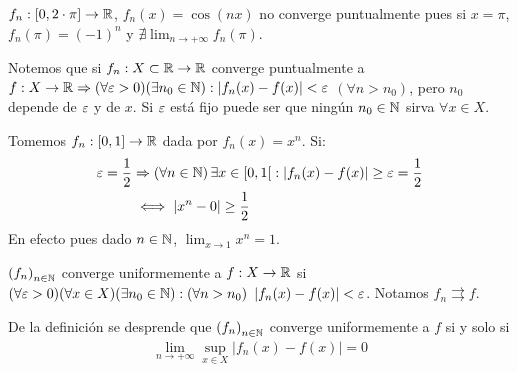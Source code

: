 \begin{eg}
  \(f_n: [0, 2 \cdot \pi] \to \mathbb{R} \), \(f_n(x) = \cos(nx)\) no converge puntualmente pues si \(x = \pi \), \(f_n(\pi) = {(-1)}^n\) y \(\nexists \lim_{n \to +\infty} f_n(\pi)\).
\end{eg}

Notemos que si \(f_n: X \subset \mathbb{R} \to \mathbb{R} \) converge puntualmente a \(f: X \to \mathbb{R} \Rightarrow (\forall \varepsilon > 0)(\exists n_0 \in \mathbb{N}) : |f_n(x) - f(x)| < \varepsilon \) \((\forall n > n_0)\), pero \(n_0\) depende de \(\varepsilon \) y de \(x\). Si \(\varepsilon \) está fijo puede ser que ningún \(n_0 \in \mathbb{N} \) sirva \(\forall x \in X\).

\begin{eg}
  Tomemos \(f_n: [0, 1] \to \mathbb{R} \) dada por \(f_n(x) = x^n\). Si: \begin{align*}
    \e = \frac{1}{2} & \Rightarrow (\forall n \in \N) \, \exists x \in \interval[open right]{0}{1} : |f_n(x) - f(x)| \geq \e = \frac{1}{2} \\
                     & \iff |x^n - 0| \geq \frac{1}{2}
  \end{align*}
  En efecto pues dado \(n \in \mathbb{N} \), \(\lim_{x \to 1} x^n = 1\).
\end{eg}

\begin{definition}
  \({(f_n)}_{n \in \mathbb{N}} \) converge uniformemente a \(f: X \to \mathbb{R} \) si \((\forall \varepsilon > 0)(\forall x \in X)(\exists n_0 \in \mathbb{N}) : (\forall n > n_0)\) \(|f_n(x) - f(x)| < \varepsilon \). Notamos \(f_n \rightrightarrows f\).
\end{definition}

De la definición se desprende que \({(f_n)}_{n \in \mathbb{N}} \) converge uniformemente a \(f\) si y solo si \begin{align*}
  \lim_{n \to +\infty} \sup_{x \in X} |f_n(x) - f(x)| = 0
\end{align*}

